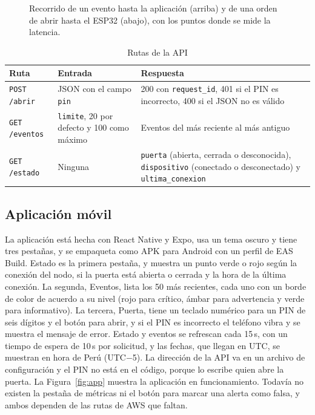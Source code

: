 \documentclass[manuscript,screen,nonacm]{acmart}
\begin{document}
\begin{figure}[htbp]
\centering
{}
\caption{Recorrido de un evento hasta la aplicación (arriba) y de una orden de abrir hasta el ESP32 (abajo), con los puntos donde se mide la latencia.}
\label{fig:secuencia}
\end{figure}

\begin{table}[htbp]
\centering
\caption{Rutas de la API}
\label{tab:api}
\footnotesize
\renewcommand{\arraystretch}{1.15}
\begin{tabular}{@{}L{2.6cm}L{4.3cm}L{6.1cm}@{}}
\toprule
\textbf{Ruta} & \textbf{Entrada} & \textbf{Respuesta} \\
\midrule
\texttt{POST /abrir} & JSON con el campo \texttt{pin} & 200 con \texttt{request\_id}, 401 si el PIN es incorrecto, 400 si el JSON no es válido \\
\texttt{GET /eventos} & \texttt{limite}, 20 por defecto y 100 como máximo & Eventos del más reciente al más antiguo \\
\texttt{GET /estado} & Ninguna & \texttt{puerta} (abierta, cerrada o desconocida), \texttt{dispositivo} (conectado o desconectado) y \texttt{ultima\_conexion} \\
\bottomrule
\end{tabular}
\end{table}

\subsection{Aplicación móvil}
\label{sec:app}
La aplicación está hecha con React Native y Expo, usa un tema oscuro y tiene tres pestañas, y se empaqueta como APK para Android con un perfil de EAS Build. Estado es la primera pestaña, y muestra un punto verde o rojo según la conexión del nodo, si la puerta está abierta o cerrada y la hora de la última conexión. La segunda, Eventos, lista los 50 más recientes, cada uno con un borde de color de acuerdo a su nivel (rojo para crítico, ámbar para advertencia y verde para informativo). La tercera, Puerta, tiene un teclado numérico para un PIN de seis dígitos y el botón para abrir, y si el PIN es incorrecto el teléfono vibra y se muestra el mensaje de error. Estado y eventos se refrescan cada 15\,s, con un tiempo de espera de 10\,s por solicitud, y las fechas, que llegan en UTC, se muestran en hora de Perú (UTC$-$5). La dirección de la API va en un archivo de configuración y el PIN no está en el código, porque lo escribe quien abre la puerta. La Figura~\ref{fig:app} muestra la aplicación en funcionamiento. Todavía no existen la pestaña de métricas ni el botón para marcar una alerta como falsa, y ambos dependen de las rutas de AWS que faltan.
\end{document}
